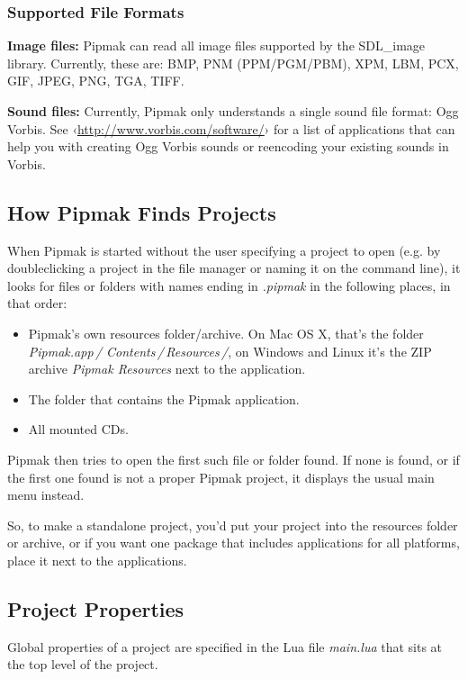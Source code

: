 \documentclass[
	a4paper,
	pagesize,
	10pt,
	oneside,
	idxtotoc,
	bibtotoc,
	BCOR10mm,
	DIV10
]{scrartcl} %
\newcommand{\emphindexed}[1]{\emph{#1}\index{#1}}
\renewcommand{\url}[1]{\textsf{‹\href{#1}{#1}›}}
\begin{document}
\subsubsection{Supported File Formats}
\textbf{Image files:} Pipmak can read all image files supported by the SDL\_image library. Currently, these are: BMP, PNM (PPM/PGM/PBM), XPM, LBM, PCX, GIF, JPEG, PNG, TGA, TIFF.

\textbf{Sound files:} Currently, Pipmak only understands a single sound file format: Ogg Vorbis. See \url{http://www.vorbis.com/software/} for a list of applications that can help you with creating Ogg Vorbis sounds or reencoding your existing sounds in Vorbis.

\subsection{How Pipmak Finds Projects}
When Pipmak is started without the user specifying a project to open (e.g. by doubleclicking a project in the file manager or naming it on the command line), it looks for files or folders with names ending in \emph{.pipmak} in the following places, in that order:
\begin{itemize}
\item Pipmak's own resources folder/archive. On Mac OS X, that's the folder \emph{Pipmak.app\,/ Contents\,/\,Resources\,/}, on Windows and Linux it's the ZIP archive \emph{Pipmak Resources} next to the application.
\item The folder that contains the Pipmak application.
\item All mounted CDs.
\end{itemize}

Pipmak then tries to open the first such file or folder found. If none is found, or if the first one found is not a proper Pipmak project, it displays the usual main menu instead.

So, to make a standalone project, you'd put your project into the resources folder or archive, or if you want one package that includes applications for all platforms, place it next to the applications. 

\subsection{Project Properties}
Global properties of a project are specified in the Lua file \emphindexed{main.lua} that sits at the top level of the project.
\end{document}
